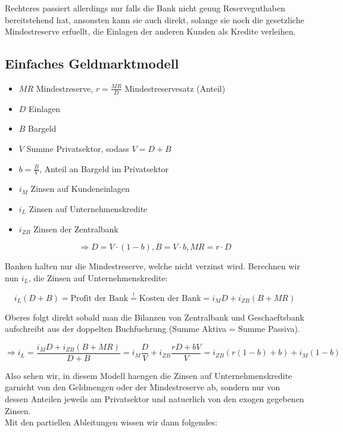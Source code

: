 \documentclass[a4paper]{article}
\begin{document}
Rechteres passiert allerdings nur falls die Bank nicht genug Reserveguthaben
bereitstehend hat, ansonsten kann sie auch direkt,
solange sie noch die gesetzliche Mindestreserve erfuellt,
die Einlagen der anderen Kunden als Kredite verleihen.

\subsection{Einfaches Geldmarktmodell}

\begin{itemize}
	\item $MR$ Mindestreserve, $r = \frac{ MR }{ D }$ Mindestreservesatz (Anteil)
	\item $D$ Einlagen
	\item $B$ Bargeld
	\item $V$ Summe Privatsektor, sodass $V = D + B$
	\item $b = \frac{ B }{ V }$, Anteil an Bargeld im Privatsektor
	\item $i_M$ Zinsen auf Kundeneinlagen
	\item $i_L$ Zinsen auf Unternehmenskredite
	\item $i_{ZB}$ Zinsen der Zentralbank
\end{itemize}

\[
	\Rightarrow
	D = V \cdot (1 - b),
	B = V \cdot b,
	MR = r \cdot D
\]

Banken halten nur die Mindestreserve, welche nicht verzinst wird.
Berechnen wir nun $i_L$, die Zinsen auf Unternehmenskredite:

\[
	i_L (D + B) = \text{Profit der Bank}
	\overset{!} =
	\text{Kosten der Bank}
	=
	i_M D + i_{ZB} (B + MR)
\]

Oberes folgt direkt sobald man die Bilanzen von Zentralbank und Geschaeftsbank
aufschreibt aus der doppelten Buchfuehrung (Summe Aktiva = Summe Passiva).

\[
	\Rightarrow i_L = \frac{ i_M D + i_{ZB} (B + MR) }{ D + B } =
	i_M \frac{ D }{ V } + i_{ZB} \frac{ rD + bV }{ V } =
	i_{ZB} \left(
	r (1-b) + b
	\right) + i_M \left(
	1 - b
	\right)
\]

Also sehen wir, in diesem Modell haengen die Zinsen auf Unternehmenskredite
garnicht von den Geldmengen oder der Mindestreserve ab, sondern nur von dessen
Anteilen jeweils am Privatsektor und natuerlich von den exogen gegebenen Zinsen. \\

Mit den partiellen Ableitungen wissen wir dann folgendes:
\end{document}
